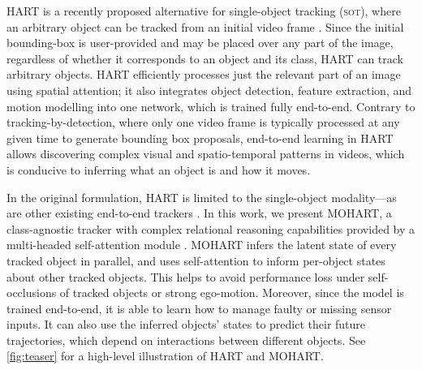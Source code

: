 \Gls{HART} is a recently proposed alternative for single-object tracking (\textsc{sot}), where an arbitrary object can be tracked from an initial video frame \citep{Kosiorek2017hierch}.
Since the initial bounding-box is user-provided and may be placed over any part of the image, regardless of whether it corresponds to an object and its class, \gls{HART} can track arbitrary objects.
\Gls{HART} efficiently processes just the relevant part of an image using spatial attention; it also integrates object detection, feature extraction, and motion modelling into one network, which is trained fully end-to-end.
Contrary to tracking-by-detection, where only one video frame is typically processed at any given time to generate bounding box proposals, end-to-end learning in \gls{HART} allows discovering complex visual and spatio-temporal patterns in videos, which is conducive to inferring what an object is and how it moves.

In the original formulation, \gls{HART} is limited to the single-object modality---as are other existing end-to-end trackers \cite{Kahou2015ratm,Danesh2019deep,Gordon2018re3}.
In this work, we present \gls{MOHART}, a class-agnostic tracker with complex relational reasoning capabilities provided by a multi-headed self-attention module \citep{Vaswani17,Lee2019set}. 
\Gls{MOHART} infers the latent state of every tracked object in parallel, and uses self-attention to inform per-object states about other tracked objects.
This helps to avoid performance loss under self-occlusions of tracked objects or strong ego-motion.
Moreover, since the model is trained end-to-end, it is able to learn how to manage faulty or missing sensor inputs.
It can also use the inferred objects' states to predict their future trajectories, which depend on interactions between different objects. See \cref{fig:teaser} for a high-level illustration of \gls{HART} and \gls{MOHART}.

